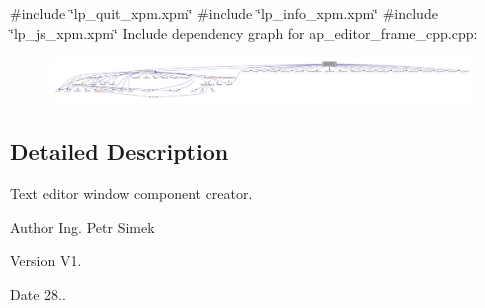 {\ttfamily \#include \char`\"{}lp\+\_\+quit\+\_\+xpm.\+xpm\char`\"{}}\newline
{\ttfamily \#include \char`\"{}lp\+\_\+info\+\_\+xpm.\+xpm\char`\"{}}\newline
{\ttfamily \#include \char`\"{}lp\+\_\+js\+\_\+xpm.\+xpm\char`\"{}}\newline
Include dependency graph for ap\+\_\+editor\+\_\+frame\+\_\+cpp.\+cpp\+:
\nopagebreak
\begin{figure}[H]
\begin{center}
\leavevmode
\includegraphics[width=350pt]{ap__editor__frame__cpp_8cpp__incl}
\end{center}
\end{figure}


\subsection{Detailed Description}
Text editor window component creator. 

\begin{DoxyAuthor}{Author}
Ing. Petr Simek 
\end{DoxyAuthor}
\begin{DoxyVersion}{Version}
V1. 
\end{DoxyVersion}
\begin{DoxyDate}{Date}
28.. 
\end{DoxyDate}
